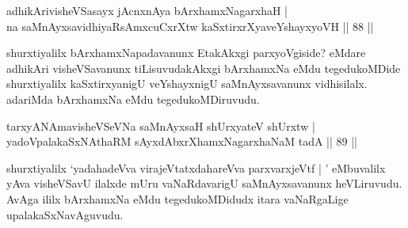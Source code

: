 
\begin{shl}
adhikArivisheVSasayx jAcnxnAya bArxhamxNagarxhaH |\\
na saMnAyxsavidhiyaRsAmxcuCxrXtw kaSxtirxrXyaveYshayxyoVH \hfill || 88 ||
\end{shl}

\begin{artha}
shurxtiyalilx bArxhamxNapadavanunx EtakAkxgi parxyoVgiside? eMdare adhikAri visheVSavanunx tiLisuvudakAkxgi bArxhamxNa eMdu tegedukoMDide shurxtiyalilx kaSxtirxyanigU veYshayxnigU saMnAyxsavanunx vidhisilalx. adariMda bArxhamxNa eMdu tegedukoMDiruvudu.
\end{artha}


\begin{shl}
tarxyANAmavisheVSeVNa saMnAyxsaH shUrxyateV shUrxtw |\\
yadoVpalakaSxNAthaRM sAyxdAbxrXhamxNagarxhaNaM tadA \hfill || 89 ||
\end{shl}

\begin{artha}
shurxtiyalilx `yadahadeVva virajeVtatxdahareVva parxvarxjeVtf | ' eMbuvalilx yAva visheVSavU ilalxde mUru vaNaRdavarigU saMnAyxsavanunx heVLiruvudu. AvAga ililx bArxhamxNa eMdu tegedukoMDidudx itara vaNaRgaLige upalakaSxNavAguvudu.
\end{artha}





